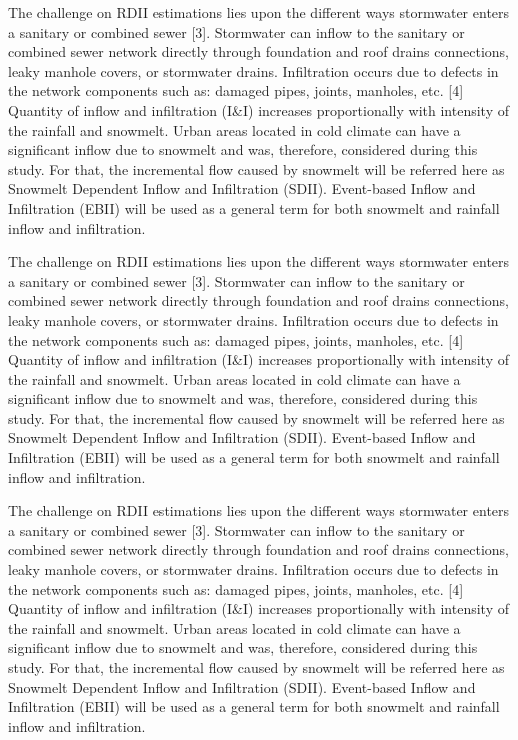 The challenge on RDII estimations lies upon the different ways stormwater enters a sanitary or combined sewer [3]. Stormwater can inflow to the sanitary or combined sewer network directly through foundation and roof drains connections, leaky manhole covers, or stormwater drains.  Infiltration occurs due to defects in the network components such as: damaged pipes, joints, manholes, etc. [4]
Quantity of inflow and infiltration (I&I) increases proportionally with intensity of the rainfall and snowmelt. Urban areas located in cold climate can have a significant inflow due to snowmelt and was, therefore, considered during this study. For that, the incremental flow caused by snowmelt will be referred here as Snowmelt Dependent Inflow and Infiltration (SDII). Event-based Inflow and Infiltration (EBII) will be used as a general term for both snowmelt and rainfall inflow and infiltration.

The challenge on RDII estimations lies upon the different ways stormwater enters a sanitary or combined sewer [3]. Stormwater can inflow to the sanitary or combined sewer network directly through foundation and roof drains connections, leaky manhole covers, or stormwater drains.  Infiltration occurs due to defects in the network components such as: damaged pipes, joints, manholes, etc. [4]
Quantity of inflow and infiltration (I&I) increases proportionally with intensity of the rainfall and snowmelt. Urban areas located in cold climate can have a significant inflow due to snowmelt and was, therefore, considered during this study. For that, the incremental flow caused by snowmelt will be referred here as Snowmelt Dependent Inflow and Infiltration (SDII). Event-based Inflow and Infiltration (EBII) will be used as a general term for both snowmelt and rainfall inflow and infiltration.

The challenge on RDII estimations lies upon the different ways stormwater enters a sanitary or combined sewer [3]. Stormwater can inflow to the sanitary or combined sewer network directly through foundation and roof drains connections, leaky manhole covers, or stormwater drains.  Infiltration occurs due to defects in the network components such as: damaged pipes, joints, manholes, etc. [4]
Quantity of inflow and infiltration (I&I) increases proportionally with intensity of the rainfall and snowmelt. Urban areas located in cold climate can have a significant inflow due to snowmelt and was, therefore, considered during this study. For that, the incremental flow caused by snowmelt will be referred here as Snowmelt Dependent Inflow and Infiltration (SDII). Event-based Inflow and Infiltration (EBII) will be used as a general term for both snowmelt and rainfall inflow and infiltration.

